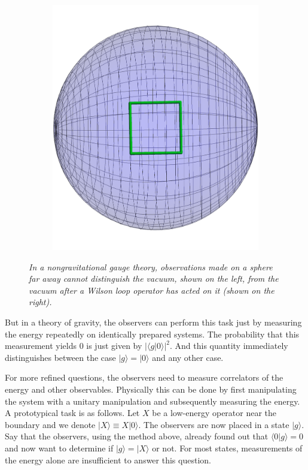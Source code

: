 \documentclass[12pt]{article}
\begin{document}
\begin{figure}[!ht]
\begin{subfigure}{0.4\textwidth}
\includegraphics[height=0.3\textheight]{wilsonloopinside.pdf}
\caption{\label{rightfig}}
\end{subfigure}
\caption{\em In a nongravitational gauge theory, observations made on a sphere far away  cannot distinguish the vacuum, shown on the left, from the vacuum after a Wilson loop operator has acted on it (shown on the right).  \label{figloop}}
\end{figure}

But in a theory of gravity, the observers can perform this task just by measuring the energy repeatedly on identically prepared systems. The probability that this measurement yields $0$ is just given by  $|\langle g| 0 \rangle|^2$. And this quantity immediately distinguishes between the case $|g \rangle = |0 \rangle$ and any other case.

For more refined questions, the observers need to measure correlators of the energy and other observables.  Physically this can be done by first manipulating the system with a unitary manipulation and subsequently measuring the energy. A prototypical task is as follows. Let $X$ be a low-energy operator near the boundary and we denote $|X \rangle \equiv X | 0 \rangle$. The observers are now placed in a state $|g \rangle$. Say that the observers, using the method above, already found out that $\langle 0 | g \rangle = 0$ and now want to determine if $|g \rangle = | X \rangle$ or not. For most states, measurements of the energy alone are insufficient to answer this question.
\end{document}
